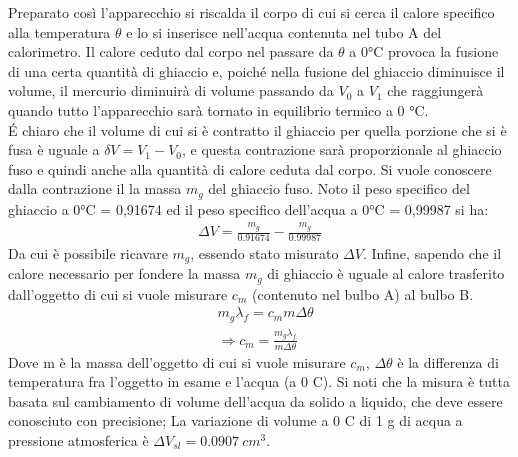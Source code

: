 \documentclass[10pt,a4paper]{article}
\begin{document}
Preparato così l’apparecchio si riscalda il corpo di cui si cerca il calore specifico alla temperatura $\theta$ e lo si inserisce nell’acqua contenuta nel tubo A del calorimetro. Il calore ceduto dal corpo nel passare da $\theta$ a 0°C provoca la fusione di una certa quantità di ghiaccio e, poiché nella fusione del ghiaccio diminuisce il volume, il mercurio diminuirà di volume passando da $V_0$ a $V_1$ che raggiungerà quando tutto l’apparecchio sarà tornato in equilibrio termico a 0 °C.\\
\'{E} chiaro che il volume di cui si è contratto il ghiaccio per quella porzione che si è fusa è uguale a $\delta V = V_1-V_0$, e questa contrazione sarà proporzionale al ghiaccio fuso e quindi anche alla quantità di calore ceduta dal corpo. Si vuole conoscere dalla contrazione il la massa $m_g$ del ghiaccio fuso. Noto il peso specifico del ghiaccio a 0°C = 0,91674 ed il peso specifico dell’acqua a 0°C = 0,99987 si ha:
\begin{align*} 
	\Delta V = \frac{m_g}{0.91674}-\frac{m_g}{0.99987}
\end{align*} 
Da cui è possibile ricavare $m_g$, essendo stato misurato $\Delta V$. Infine, sapendo che il calore necessario per fondere la massa $m_g$ di ghiaccio è uguale al calore trasferito dall'oggetto di cui si vuole misurare $c_m$ (contenuto nel bulbo A) al bulbo B.
\begin{align*} 
&m_g \lambda_f = c_m m \Delta\theta\\
&\Rightarrow c_m = \frac{m_g \lambda_f}{m \Delta \theta}
\end{align*} 
Dove m è la massa dell'oggetto di cui si vuole misurare $c_m$, $\Delta \theta$ è la differenza di temperatura fra l'oggetto in esame e l'acqua (a 0 \textdegree C). Si noti che la misura è tutta basata sul cambiamento di volume dell'acqua da solido a liquido, che deve essere conosciuto con precisione; La variazione di volume a 0 \textdegree C di 1 g di acqua a pressione atmosferica è  $\Delta V_{sl} = 0.0907\ cm^3$.
\end{document}
